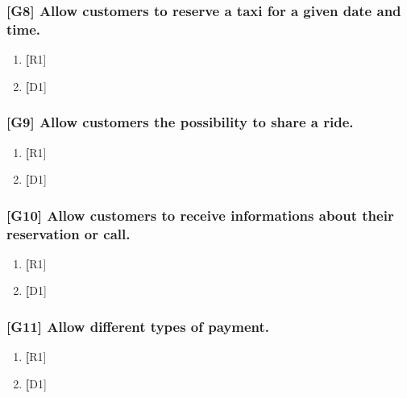 \subsubsection{[G8] Allow customers to reserve a taxi for a given date and time.}
	\begin{enumerate}
	\item \textbf [R1]
	\item \textbf [D1] 
	\end{enumerate}

\subsubsection{[G9] Allow customers the possibility to share a ride.}
	\begin{enumerate}
	\item \textbf [R1]
	\item \textbf [D1] 
	\end{enumerate}

\subsubsection{[G10] Allow customers to receive informations about their reservation or call.}
	\begin{enumerate}
	\item \textbf [R1]
	\item \textbf [D1] 
	\end{enumerate}

\subsubsection{[G11] Allow different types of payment.}
	\begin{enumerate}
	\item \textbf [R1]
	\item \textbf [D1] 
	\end{enumerate}	

%
